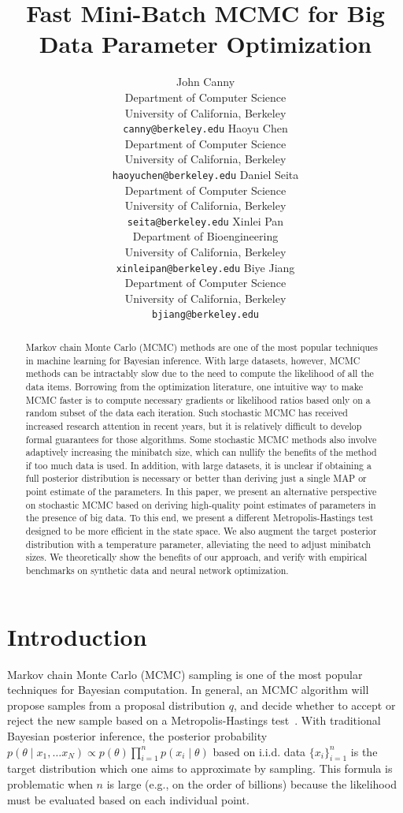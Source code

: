 \documentclass{article}
\title{Fast Mini-Batch MCMC for Big Data Parameter Optimization}
\author{
  John Canny \\
  Department of Computer Science \\
  University of California, Berkeley \\
  \texttt{canny@berkeley.edu}
  \And
  Haoyu Chen \\
  Department of Computer Science \\
  University of California, Berkeley \\
  \texttt{haoyuchen@berkeley.edu}
  \And
  Daniel Seita \\
  Department of Computer Science \\
  University of California, Berkeley \\
  \texttt{seita@berkeley.edu}
  \And
  Xinlei Pan \\
  Department of Bioengineering \\
  University of California, Berkeley \\
  \texttt{xinleipan@berkeley.edu}
  \And 
  Biye Jiang \\
  Department of Computer Science \\
  University of California, Berkeley \\
  \texttt{bjiang@berkeley.edu}
}
\begin{document}

\maketitle

\begin{abstract}
Markov chain Monte Carlo (MCMC) methods are one of the most popular techniques in machine learning
for Bayesian inference. With large datasets, however, MCMC methods can be intractably slow due to
the need to compute the likelihood of all the data items. Borrowing from the optimization
literature, one intuitive way to make MCMC faster is to compute necessary gradients or likelihood
ratios based only on a random subset of the data each iteration. Such stochastic MCMC has received
increased research attention in recent years, but it is relatively difficult to develop formal
guarantees for those algorithms. Some stochastic MCMC methods also involve adaptively increasing the
minibatch size, which can nullify the benefits of the method if too much data is used. In addition,
with large datasets, it is unclear if obtaining a full posterior distribution is necessary or better
than deriving just a single MAP or point estimate of the parameters. In this paper, we present an
alternative perspective on stochastic MCMC based on deriving high-quality point estimates of
parameters in the presence of big data. To this end, we present a different Metropolis-Hastings test
designed to be more efficient in the state space. We also augment the target posterior distribution
with a temperature parameter, alleviating the need to adjust minibatch sizes.  We theoretically
show the benefits of our approach, and verify with empirical benchmarks on synthetic data and neural
network optimization.
\end{abstract}



\section{Introduction}\label{sec:introduction}

Markov chain Monte Carlo (MCMC) sampling is one of the most popular techniques for Bayesian
computation. In general, an MCMC algorithm will propose samples from a proposal distribution $q$,
and decide whether to accept or reject the new sample based on a Metropolis-Hastings
test~\cite{Metropolis1953,hastings70}. With traditional Bayesian posterior inference, the posterior
probability $p(\theta \mid x_1, \ldots x_N) \propto p(\theta)\prod_{i=1}^np(x_i \mid \theta)$ based
on i.i.d. data $\{x_i\}_{i=1}^n$ is the target distribution which one aims to approximate by
sampling. This formula is problematic when $n$ is large (e.g., on the order of billions) because the
likelihood must be evaluated based on each individual point.
\end{document}
